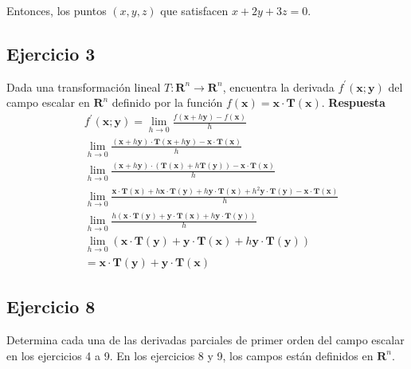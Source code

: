 \documentclass{report}
\begin{document}
    Entonces, los puntos $(x, y, z)$ que satisfacen $x + 2y + 3z = 0$.\subsection*{Ejercicio 3}
    Dada una transformación lineal $T: \mathbf{R}^{n} \rightarrow \mathbf{R}^{n}$, encuentra la derivada $f^{\prime}(\boldsymbol{x} ; \boldsymbol{y})$ del campo escalar en $\mathbf{R}^{n}$ definido por la función $f(\boldsymbol{x})=\boldsymbol{x} \cdot \boldsymbol{T}(\boldsymbol{x})$.
    \textbf{Respuesta}
    $$
    \begin{aligned}
    & f^{\prime}(\boldsymbol{x} ; \boldsymbol{y})=\lim_{h \rightarrow 0} \frac{f(\boldsymbol{x}+h \boldsymbol{y})-f(\boldsymbol{x})}{h} \\
    & \lim _{h \rightarrow 0} \frac{(\boldsymbol{x}+h \boldsymbol{y}) \cdot \boldsymbol{T}(\boldsymbol{x}+h \boldsymbol{y})-\boldsymbol{x} \cdot \boldsymbol{T}(\boldsymbol{x})}{h} \\
    & \lim _{h \rightarrow 0} \frac{(\boldsymbol{x}+h \boldsymbol{y}) \cdot (\boldsymbol{T}(\boldsymbol{x})+h \boldsymbol{T}(\boldsymbol{y}))-\boldsymbol{x} \cdot \boldsymbol{T}(\boldsymbol{x})}{h} \\
    & \lim _{h \rightarrow 0} \frac{\boldsymbol{x} \cdot \boldsymbol{T}(\boldsymbol{x}) + h \boldsymbol{x} \cdot \boldsymbol{T}(\boldsymbol{y}) + h \boldsymbol{y} \cdot \boldsymbol{T}(\boldsymbol{x}) + h^2 \boldsymbol{y} \cdot \boldsymbol{T}(\boldsymbol{y}) - \boldsymbol{x} \cdot \boldsymbol{T}(\boldsymbol{x})}{h} \\
    & \lim _{h \rightarrow 0} \frac{h (\boldsymbol{x} \cdot \boldsymbol{T}(\boldsymbol{y})+\boldsymbol{y} \cdot \boldsymbol{T}(\boldsymbol{x}) + h \boldsymbol{y} \cdot \boldsymbol{T}(\boldsymbol{y}))}{h} \\
    & \lim _{h \rightarrow 0} (\boldsymbol{x} \cdot \boldsymbol{T}(\boldsymbol{y})+\boldsymbol{y} \cdot \boldsymbol{T}(\boldsymbol{x})+h \boldsymbol{y} \cdot \boldsymbol{T}(\boldsymbol{y})) \\
    & =\boldsymbol{x} \cdot \boldsymbol{T}(\boldsymbol{y})+\boldsymbol{y} \cdot \boldsymbol{T}(\boldsymbol{x})
    \end{aligned}
    $$\subsection*{Ejercicio 8}
    Determina cada una de las derivadas parciales de primer orden del campo escalar en los ejercicios 4 a 9. En los ejercicios 8 y 9, los campos están definidos en $\mathbf{R}^{n}$.\\
\end{document}
